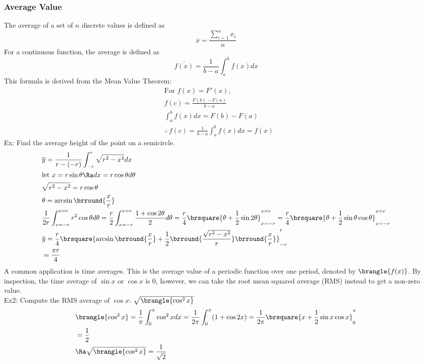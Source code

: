 \subsubsection{Average Value}
The average of a set of $n$ discrete values is defined as
$$\overline{x}=\frac{\sum\limits_{i=1}^nx_i}{n}$$
For a continuous function, the average is defined as
$$\overline{f(x)}=\frac{1}{b-a}\int_a^bf(x)dx$$
This formula is derived from the Mean Value Theorem:
\begin{align*}
    &\text{For }f(x)=F'(x),\\
    &f(c)=\frac{F(b)-F(a)}{b-a}\\
    &\int_a^bf(x)dx=F(b)-F(a)\\
    &\therefore\,f(c)=\frac{1}{b-a}\int_a^bf(x)dx=\overline{f(x)}
\end{align*}
Ex: Find the average height of the point on a semicircle.
\begin{align*}
    &\overline{y}=\frac{1}{r-(-r)}\int_{-r}^r\sqrt{r^2-x^2}dx\\
    &\text{let }x=r\sin\theta\Ra dx=r\cos\theta d\theta\\
    &\sqrt{r^2-x^2}=r\cos\theta\\
    &\theta=\arcsin\brround{\frac{x}{r}}\\
    &\frac{1}{2r}\int_{x=-r}^{x=r}r^2\cos\theta d\theta=\frac{r}{2}\int_{x=-r}^{x=r}\frac{1+\cos2\theta}{2}d\theta=\frac{r}{4}\brsquare{\theta+\frac{1}{2}\sin2\theta}_{x=-r}^{x=r}=\frac{r}{4}\brsquare{\theta+\frac{1}{2}\sin\theta\cos\theta}_{x=-r}^{x=r}\\
    &\overline{y}=\frac{r}{4}\brsquare{\arcsin\brround{\frac{x}{r}}+\frac{1}{2}\brround{\frac{\sqrt{r^2-x^2}}{r}}\brround{\frac{x}{r}}}_{-r}^r\\
    &=\frac{\pi r}{4}
\end{align*}
A common application is time averages. This is the average value of a periodic function over one period, denoted by $\brangle{f(x)}$. By inspection, the time average of $\sin x$ or $\cos x$ is 0, however, we can take the root mean squared average (RMS) instead to get a non-zero value.\\
Ex2: Compute the RMS average of $\cos x$: $\sqrt{\brangle{\cos^2x}}$
\begin{align*}
    &\brangle{\cos^2x}=\frac{1}{\pi}\int_0^\pi\cos^2xdx=\frac{1}{2\pi}\int_0^\pi(1+\cos2x)=\frac{1}{2\pi}\brsquare{x+\frac{1}{2}\sin x\cos x}_0^\pi\\
    &=\frac{1}{2}\\
    &\Ra\sqrt{\brangle{\cos^2x}}=\frac{1}{\sqrt{2}}
\end{align*}
